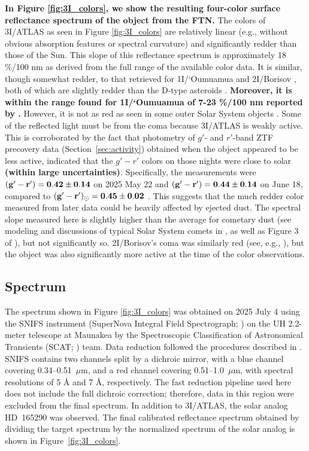 \documentclass[linenumbers,twocolumn,longbib]{aastex7}
\begin{document}
\textbf{In Figure \ref{fig:3I_colors}, we show the resulting four-color surface reflectance spectrum of the object from the FTN.} The colors of 3I/ATLAS as seen in Figure \ref{fig:3I_colors} are relatively linear (e.g., without obvious absorption features or spectral curvature) and significantly redder than those of the Sun. This slope of this reflectance spectrum is approximately 18  \%/100 nm as derived from the full range of the available color data. It is similar, though somewhat redder, to that retrieved for 1I/`Oumuamua \citep[10$\pm$6  \%/100 nm,][]{Ye2017} and 2I/Borisov  \citep[12$\pm$1  \%/100 nm][]{deleon2020}, both of which are slightly redder than the D-type asteroids \citep{DeMeo2009}. \textbf{Moreover, it is within the range found for 1I/`Oumuamua of 7-23  \%/100 nm reported by \citet{Fitzsimmons2017}.} However, it is not as red as seen in some outer Solar System objects  \citep[e.g. Pholus,][]{Binzel1992}. Some of the reflected light must be from the coma because 3I/ATLAS is weakly active. This is corroborated by the fact that photometry of $g'$- and $r'$-band ZTF precovery data (Section~\ref{sec:activity}) obtained when the object appeared to be less active, indicated that the $g'-r'$ colors on those nights were close to solar {\bf (within large uncertainties)}. Specifically, the measurements were ${\bf (g'-r')=0.42\pm0.14}$ on 2025 May 22 and ${\bf (g'-r')=0.44\pm0.14}$ on June 18, compared to ${\bf (g'-r')_{\odot}=0.45\pm0.02}$ \citep{holmberg2006_solarcolors}. This suggests that the much redder color measured from later data could be heavily affected by ejected dust. The spectral slope measured here is slightly higher than the average for cometary dust (see modeling and discussions of typical Solar System comets in \citealt{protopapa2018, kareta_noonan23}, as well as Figure 3 of \citealt{2024come.book..621K}), but not significantly so. 2I/Borisov's coma was similarly red (see, e.g., \citealt{deleon2020}), but the object was also significantly more active at the time of the color observations.



\subsection{Spectrum}\label{sec:spectrum}

The spectrum shown in Figure \ref{fig:3I_colors} was obtained on 2025 July 4 using the SNIFS instrument (SuperNova Integral Field Spectrograph; \citealp{Lantz2004}) on the UH 2.2-meter telescope at Maunakea by the Spectroscopic Classification of Astronomical Transients (SCAT; \citealp{Tucker2022}) team. Data reduction followed the procedures described in \citet{Tucker2022}. SNIFS contains two channels split by a dichroic mirror, with a blue channel covering 0.34--0.51~$\mu$m, and a red channel covering 0.51--1.0~$\mu$m, with spectral resolutions of 5 \r{A} and 7 \r{A}, respectively. The fast reduction pipeline used here does not include the full dichroic correction; therefore, data in this region were excluded from the final spectrum. In addition to 3I/ATLAS, the solar analog HD~165290 was observed. The final calibrated reflectance spectrum obtained by dividing the target spectrum by the normalized spectrum of the solar analog is shown in Figure~\ref{fig:3I_colors}.
\end{document}
